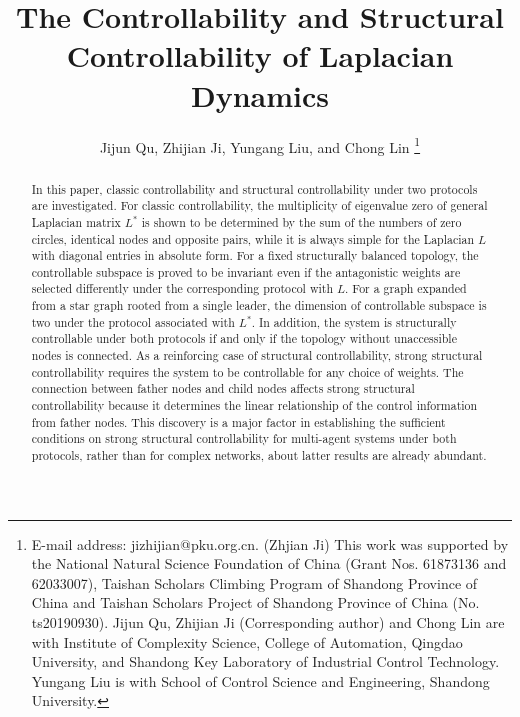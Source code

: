\documentclass[a4paper,11pt]{article}
\begin{document}
\theorembodyfont{\normalfont}
\theoremheaderfont{\itshape}%
\theoremseparator{:}
\newtheorem{theorem}{\indent Theorem}
\newtheorem{lemma}{\indent Lemma}
\newtheorem{proposition}{\indent Proposition}
\newtheorem{corollary}{\indent Corollary}
\newtheorem{definition}{\indent Definition}%
\newtheorem{remark}{\indent Remark}
\newtheorem{example}{\indent Example}
\newtheorem*{proof}{Proof}
\def\QEDclosed{\mbox{\rule[0pt]{1.5ex}{1.5ex}}} %
\def\QED{\QEDclosed} %
\def\endproof{\hspace*{\fill}~\QED\par\endtrivlist\unskip}%
\newcommand\blfootnote[1]{%
\begingroup
\renewcommand\thefootnote{}\footnote{#1}%
\addtocounter{footnote}{-1}%
\endgroup
}
\title{The Controllability and Structural Controllability of Laplacian Dynamics}
\author{Jijun Qu, Zhijian Ji, Yungang Liu, and Chong Lin
\thanks{E-mail address: jizhijian@pku.org.cn. (Zhjian Ji)
This work was supported by the National Natural Science Foundation of China (Grant Nos. 61873136 and 62033007), Taishan Scholars Climbing Program of Shandong Province of China and Taishan Scholars Project of Shandong Province of China (No. ts20190930).
Jijun Qu, Zhijian Ji (Corresponding author) and Chong Lin are with Institute of Complexity Science, College of Automation, Qingdao University, and Shandong Key Laboratory of Industrial Control Technology. Yungang Liu is with School of Control Science and Engineering, Shandong University.}}\maketitle
\begin{abstract}
In this paper, classic controllability and structural controllability under two protocols are investigated. For classic controllability, the multiplicity of eigenvalue zero of general Laplacian matrix $L^*$  is shown to be determined by the sum of the numbers of zero circles, identical nodes and opposite pairs, while it is always simple for the Laplacian $L$ with diagonal entries in absolute form. For a fixed structurally balanced topology,  the controllable subspace is proved to be invariant even if the antagonistic weights are selected differently under the corresponding protocol with $L$.   For a graph expanded from a star graph rooted from a single leader, the dimension of controllable subspace is  two under the protocol associated with $L^*$. In addition, the system is structurally controllable under both protocols if and only if the topology without unaccessible nodes is connected. As a reinforcing case of structural controllability, strong structural controllability requires the system to be controllable for any choice of weights. The connection between father nodes and child nodes affects  strong structural controllability because it determines the linear relationship of the control information from father nodes. This discovery is a major factor in establishing the sufficient conditions on strong structural controllability for multi-agent systems under both protocols, rather than for complex networks, about latter results are already abundant.
\end{abstract}
\end{document}
